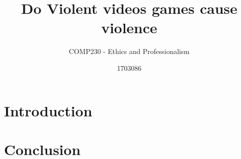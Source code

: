 \documentclass{scrartcl}
\title{Do Violent videos games cause violence}
\subtitle{COMP230 - Ethics and Professionalism}
\author{1703086}
\begin{document}
\maketitle


\section{Introduction}


\section{Conclusion}




\end{document}
